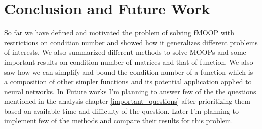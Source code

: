 \chapter{Conclusion and Future Work}
So far we have defined and motivated the problem of solving fMOOP with restrictions on condition number and showed how it generalizes different problems of interests. We also summarized different methods to solve MOOPs and some important results on condition number of matrices and that of function. We also saw how we can simplify and bound the condition number of a function which is a composition of other simpler functions and its potential application applied to neural networks.
\newline \newline In Future works I'm planning to answer few of the the questions mentioned in the analysis chapter \ref{important_questions} after prioritizing them based on available time and difficulty of the question. Later I'm planning to implement few of the methods and compare their results for this problem.